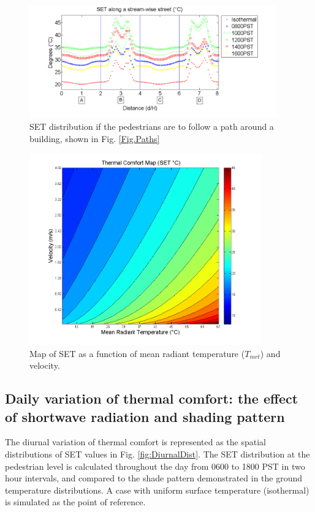 \documentclass[smallextended]{svjour3}
\begin{document}
\begin{figure}[!h]
\graphicspath{ {image/} }
\centerline{\includegraphics[width=0.95\textwidth]{loop.png}}
\caption{SET distribution if the pedestrians are to follow a path around a building, shown in Fig.  \ref{Fig.Paths}}
\label{Fig.LoopSum}
\end{figure}

\begin{figure}[!h]
\graphicspath{ {image/} }
\centerline{\includegraphics[width=10cm]{vel_mrt_map.png}}
\caption{Map of SET as a function of mean radiant temperature ($T_{mrt}$) and velocity.}
\label{Fig.mapTV}
\end{figure}

\subsection{Daily variation of thermal comfort: the effect of shortwave radiation and shading pattern}
The diurnal variation of thermal comfort is represented as the spatial distributions of SET values in Fig. \ref{fig:DiurnalDist}.  The SET distribution at the pedestrian level is calculated throughout the day from 0600 to 1800 PST in two hour intervals, and compared to the shade pattern demonstrated in the ground temperature distributions. A case with uniform surface temperature (isothermal) is simulated as the  point of reference. 
\end{document}

